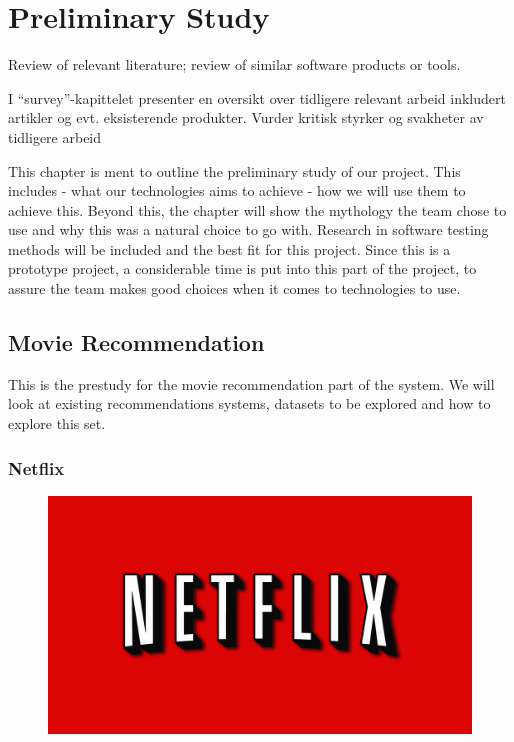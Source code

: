 
\chapter{Preliminary Study}

\minitoc

Review of relevant literature;
review of similar software products or tools.

I “survey”-kapittelet presenter en oversikt over tidligere relevant arbeid inkludert artikler og evt. eksisterende produkter.
Vurder kritisk styrker og svakheter av tidligere arbeid



This chapter is ment to outline the preliminary study of our project. This includes
    - what our technologies aims to achieve
    - how we will use them to achieve this.
Beyond this, the chapter will show the mythology the team chose to use and why this was a natural choice to go with. Research in software testing methods will be included and the best fit for this project. Since this is a prototype project, a considerable time is put into this part of the project, to assure the team makes good choices when it comes to technologies to use.

\clearpage

\section{Movie Recommendation}
This is the prestudy for the movie recommendation part of the system. We will look at existing recommendations systems, datasets to be explored and how to explore this set.


\subsection{Netflix}

\begin{figure}
\vspace{-30pt}
\centering
\includegraphics[width = .25\textwidth]{image/netflix-logo.png}
\end{figure}

